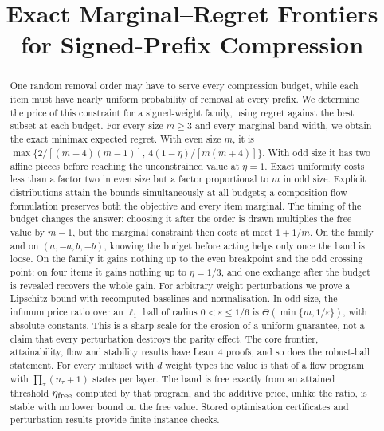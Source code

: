 



\title{Exact Marginal--Regret Frontiers\\for Signed-Prefix Compression}

\author{
}

\maketitle

\begin{abstract}
One random removal order may have to serve every compression budget, while each item must
have nearly uniform probability of removal at every prefix. We determine the price of this
constraint for a signed-weight family, using regret against the best subset at each budget.
For every size $m\ge3$ and every marginal-band width, we obtain the exact minimax expected regret.
With even size $m$, it is
$\max\{2/[(m+4)(m-1)],\,4(1-\eta)/[m(m+4)]\}$.
With odd size it has two affine pieces before reaching the unconstrained value at $\eta=1$.
Exact uniformity costs less than a factor two in even size but a factor proportional to $m$
in odd size. Explicit distributions attain the bounds simultaneously at all budgets; a
composition-flow formulation preserves both the objective and every item marginal.
The timing of the budget changes the answer: choosing it after the order is drawn
multiplies the free value by $m-1$, but the marginal constraint then costs at most $1+1/m$.
On the family and on $(a,-a,b,-b)$, knowing the budget before acting helps only once the band
is loose. On the family it gains
nothing up to the even breakpoint and the odd crossing point; on four items it gains nothing up
to $\eta=1/3$, and one exchange after the budget is revealed recovers the whole gain.
For arbitrary weight perturbations we prove a Lipschitz bound with recomputed baselines and
normalisation. In odd size, the infimum price ratio over an $\ell_1$ ball of radius
$0<\varepsilon\le1/6$ is $\Theta(\min\{m,1/\varepsilon\})$, with absolute constants.
This is a sharp scale for the erosion of a uniform guarantee, not a claim that every
perturbation destroys the parity effect. The core frontier, attainability, flow and stability
results have Lean~4 proofs, and so does the robust-ball statement.
For every multiset with $d$ weight types the value is that of a flow program with
$\prod_\tau(n_\tau+1)$ states per layer. The band is free exactly from an attained threshold
$\eta_{\rm free}$ computed by that program, and the additive price, unlike the ratio, is stable
with no lower bound on the free value.
Stored optimisation certificates and perturbation results provide finite-instance checks.
\end{abstract}

